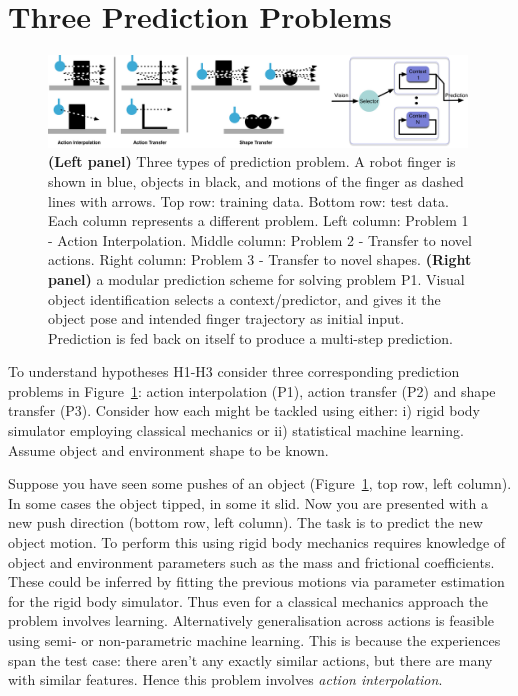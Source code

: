 \section{Three Prediction Problems	}
\label{sec:schema}

\begin{figure}[t]
\centerline{\includegraphics[width=0.99\textwidth]{three-prediction-problems-1}}
\caption{{\bf (Left panel)} Three types of prediction problem. A robot finger is shown in blue, objects in black, and motions of the finger as dashed lines with arrows. Top row: training data. Bottom row: test data. Each column represents a different problem. Left column: Problem 1 - Action Interpolation. Middle column: Problem 2 - Transfer to novel actions. Right column: Problem 3 - Transfer to novel shapes. {\bf (Right panel)} a modular prediction scheme for solving problem P1. Visual object identification selects a context/predictor, and gives it the object pose and intended finger trajectory as initial input. Prediction is fed back on itself to produce a multi-step prediction.}
\label{fig:three-prediction-problems}
\end{figure}

To understand hypotheses H1-H3 consider three corresponding prediction problems in Figure~\ref{fig:three-prediction-problems}: action interpolation (P1), action transfer (P2) and shape transfer (P3). Consider how each might be tackled using either: i) rigid body simulator employing classical mechanics or ii) statistical machine learning. Assume object and environment shape to be known.

 Suppose you have seen some pushes of an object (Figure~\ref{fig:three-prediction-problems}, top row, left column). In some cases the object tipped, in some it slid. Now you are presented with a new push direction (bottom row, left column). The task is to predict the new object motion. To perform this using rigid body mechanics requires knowledge of object and environment parameters such as the mass and frictional coefficients. These could be inferred by fitting the previous motions via parameter estimation for the rigid body simulator. Thus even for a classical mechanics approach the problem involves learning. Alternatively generalisation across actions is feasible using semi- or non-parametric machine learning. This is because the experiences span the test case: there aren't any exactly similar actions, but there are many with similar features. Hence this problem involves {\em action interpolation}.

